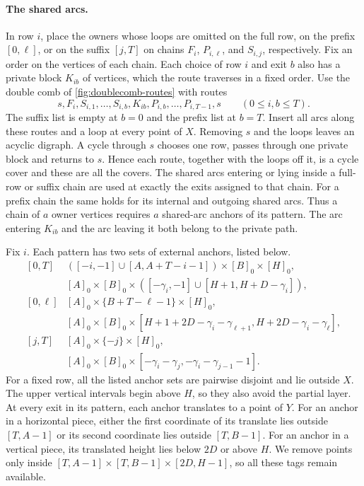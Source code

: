 \documentclass[10pt]{article}
\numberwithin{equation}{section}
\theoremstyle{definition}
\begin{document}
\paragraph{The shared arcs.}
In row $i$, place the owners whose loops are omitted on the full row, on the prefix $[0,\ell]$, or on the suffix $[j,T]$ on chains $F_i$, $P_{i,\ell}$, and $S_{i,j}$, respectively. Fix an order on the vertices of each chain. Each choice of row $i$ and exit $b$ also has a private block $K_{ib}$ of vertices, which the route traverses in a fixed order. Use the double comb of \cref{fig:doublecomb-routes} with routes
\[
 s,F_i,S_{i,1},\ldots,S_{i,b},K_{ib},P_{i,b},\ldots,P_{i,T-1},s
 \qquad(0\le i,b\le T).
\]
The suffix list is empty at $b=0$ and the prefix list at $b=T$. Insert all arcs along these routes and a loop at every point of $X$. Removing $s$ and the loops leaves an acyclic digraph. A cycle through $s$ chooses one row, passes through one private block and returns to $s$. Hence each route, together with the loops off it, is a cycle cover and these are all the covers. The shared arcs entering or lying inside a full-row or suffix chain are used at exactly the exits assigned to that chain. For a prefix chain the same holds for its internal and outgoing shared arcs. Thus a chain of $a$ owner vertices requires $a$ shared-arc anchors of its pattern. The arc entering $K_{ib}$ and the arc leaving it both belong to the private path.

Fix $i$. Each pattern has two sets of external anchors, listed below.
\[
\begin{array}{ll}
[0,T]&([-i,-1]\cup[A,A+T-i-1])\times[B]_0\times[H]_0,\\
     &[A]_0\times[B]_0\times([-\gamma_i,-1]\cup[H+1,H+D-\gamma_i]),\\[2pt]
[0,\ell]&[A]_0\times\{B+T-\ell-1\}\times[H]_0,\\
     &[A]_0\times[B]_0\times[H+1+2D-\gamma_i-\gamma_{\ell+1},H+2D-\gamma_i-\gamma_\ell],\\[2pt]
[j,T]&[A]_0\times\{-j\}\times[H]_0,\\
     &[A]_0\times[B]_0\times[-\gamma_i-\gamma_j,-\gamma_i-\gamma_{j-1}-1].
\end{array}
\]
For a fixed row, all the listed anchor sets are pairwise disjoint and lie outside $X$. The upper vertical intervals begin above $H$, so they also avoid the partial layer. At every exit in its pattern, each anchor translates to a point of $Y$. For an anchor in a horizontal piece, either the first coordinate of its translate lies outside $[T,A-1]$ or its second coordinate lies outside $[T,B-1]$. For an anchor in a vertical piece, its translated height lies below $2D$ or above $H$. We remove points only inside $[T,A-1]\times[T,B-1]\times[2D,H-1]$, so all these tags remain available.
\end{document}

